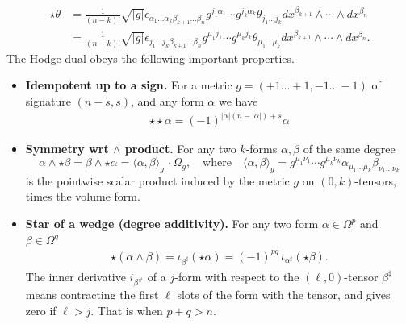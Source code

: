 \begin{mytheorem}
{\small
\begin{align}
    \star \theta &= \frac{1}{(n-k)!} \sqrt{|g|}\epsilon_{\alpha_1\dots \alpha_k\beta_{k+1}\dots \beta_n} g^{j_1 \alpha_1} \cdots g^{j_k \alpha_k} \theta_{j_1 \dots j_k} dx^{\beta_{k+1}} \wedge \cdots \wedge dx^{\beta_n}\\
    &= \frac{1}{(n-k)!} \sqrt{|g|}\epsilon_{j_1\dots j_k\beta_{k+1}\dots \beta_n} g^{\mu_1 j_1} \cdots g^{\mu_k j_k} \theta_{\mu_1\dots\mu_k} dx^{\beta_{k+1}} \wedge \cdots \wedge dx^{\beta_n}.
\end{align}}
%
The Hodge dual obeys the following important properties.
\begin{itemize}
    \item \textbf{Idempotent up to a sign.} For a metric {\small \(g=(+1\dots+1,-1\dots-1)\)} of signature {\small \((n-s,s)\)}, and any form \(\alpha\) we have
    \begin{align}
        \star \star \alpha = (-1)^{|\alpha|(n-|\alpha|) + s} \alpha
    \end{align}
    \item \textbf{Symmetry wrt $\wedge$ product.} For any two \(k\)-forms \(\alpha, \beta\) of the same degree
    \begin{equation}
        \alpha \wedge \star \beta = \beta \wedge \star \alpha = \langle \alpha, \beta \rangle_g \, \cdot \Omega_g,\quad \text{where}\quad \langle \alpha, \beta \rangle_g = g^{\mu_1 \nu_1} \cdots g^{\mu_k \nu_k} \alpha_{\mu_1 \dots \mu_k} \beta_{\nu_1 \dots \nu_k}
    \end{equation}
    is the pointwise scalar product induced by the metric \(g\) on $(0,k)$-tensors, times the volume form.
    \item \textbf{Star of a wedge (degree additivity).}
    For any two form $\alpha\in\Omega^p$ and $\beta\in\Omega^q$
    \begin{align}
        \star(\alpha\wedge\beta)
        =\iota_{\beta^\sharp}(\star\alpha)
        =(-1)^{pq}\,\iota_{\alpha^\sharp}(\star\beta).
    \end{align}
    The inner derivative $i_{\beta^{\#}}$ of a $j$-form with respect to the  $(\ell,0)$-tensor $\beta^\sharp$ means contracting the first $\ell$ slots of the form with the tensor, and gives zero if $\ell>j$. That is when $p+q>n$.
\end{itemize}
\end{mytheorem}
